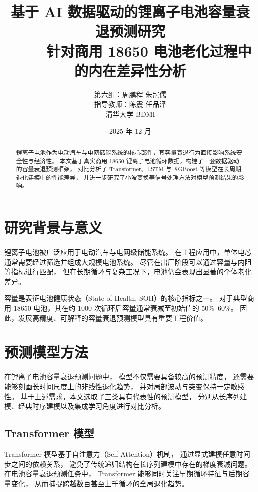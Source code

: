 \documentclass[UTF8,a4paper,12pt,fontset=fandol]{ctexart}
\title{
  基于 AI 数据驱动的锂离子电池容量衰退预测研究\\
  \large —— 针对商用 18650 电池老化过程中的内在差异性分析
}
\author{
  第六组：周鹏程 \quad 朱冠儒\\
  指导教师：陈震 \quad 任品泽\\
  清华大学 \quad BDMI
}
\date{2025 年 12 月}
\begin{document}
\maketitle

\begin{abstract}
锂离子电池作为电动汽车与电网储能系统的核心部件，其容量衰退行为直接影响系统安全性与经济性。
本文基于真实商用 18650 锂离子电池循环数据，构建了一套数据驱动的容量衰退预测框架，
对比分析了 Transformer、LSTM 与 XGBoost 等模型在长周期退化建模中的性能差异，
并进一步研究了小波变换等信号处理方法对模型预测结果的影响。
\end{abstract}

\newpage
\tableofcontents
\newpage

\section{研究背景与意义}

锂离子电池被广泛应用于电动汽车与电网级储能系统。
在工程应用中，单体电芯通常需要经过筛选并组成大规模电池系统。
尽管在出厂阶段可以通过容量与内阻等指标进行匹配，
但在长期循环与复杂工况下，电池仍会表现出显著的个体老化差异。

容量是表征电池健康状态（State of Health, SOH）的核心指标之一。
对于典型商用 18650 电池，其在约 1000 次循环后容量通常衰减至初始值的 50\%--60\%。
因此，发展高精度、可解释的容量衰退预测模型具有重要工程价值。
\section{预测模型方法}

在锂离子电池容量衰退预测问题中，
模型不仅需要具备较高的预测精度，
还需要能够刻画长时间尺度上的非线性退化趋势，
并对局部波动与突变保持一定敏感性。
基于上述需求，本文选取了三类具有代表性的预测模型，
分别从长序列建模、经典时序建模以及集成学习角度进行对比分析。

\subsection{Transformer 模型}

Transformer 模型基于自注意力（Self-Attention）机制，
通过显式建模任意时间步之间的依赖关系，
避免了传统递归结构在长序列建模中存在的梯度衰减问题。
在电池容量衰退预测任务中，
Transformer 能够同时关注早期循环特征与后期容量变化，
从而捕捉跨越数百甚至上千循环的全局退化趋势。
\end{document}

